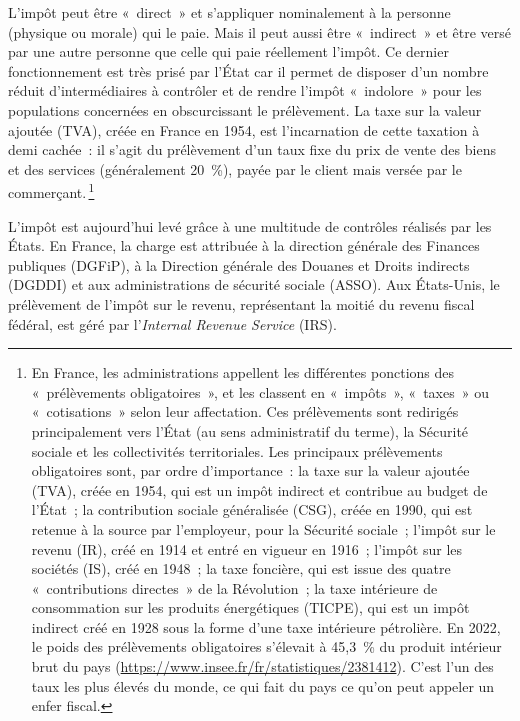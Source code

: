 \documentclass[a4paper,notitlepage]{article}
\newcommand{\eng}[1]{{\NoAutoSpaceBeforeFDP\emph{#1}}}  %
\newcommand{\sfootnote}{\,\footnote}
\begin{document}
L'impôt peut être «~direct~» et s'appliquer nominalement à la personne (physique ou morale) qui le paie. Mais il peut aussi être «~indirect~» et être versé par une autre personne que celle qui paie réellement l'impôt. Ce dernier fonctionnement est très prisé par l'État car il permet de disposer d'un nombre réduit d'intermédiaires à contrôler et de rendre l'impôt «~indolore~» pour les populations concernées en obscurcissant le prélèvement. La taxe sur la valeur ajoutée (TVA), créée en France en 1954, est l'incarnation de cette taxation à demi cachée~: il s'agit du prélèvement d'un taux fixe du prix de vente des biens et des services (généralement 20~\%), payée par le client mais versée par le commerçant.\sfootnote{En France, les administrations appellent les différentes ponctions des «~prélèvements obligatoires~», et les classent en «~impôts~», «~taxes~» ou «~cotisations~» selon leur affectation. Ces prélèvements sont redirigés principalement vers l'État (au sens administratif du terme), la Sécurité sociale et les collectivités territoriales. Les principaux prélèvements obligatoires sont, par ordre d'importance~: la taxe sur la valeur ajoutée (TVA), créée en 1954, qui est un impôt indirect et contribue au budget de l'État~; la contribution sociale généralisée (CSG), créée en 1990, qui est retenue à la source par l'employeur, pour la Sécurité sociale~; l'impôt sur le revenu (IR), créé en 1914 et entré en vigueur en 1916~; l'impôt sur les sociétés (IS), créé en 1948~; la taxe foncière, qui est issue des quatre «~contributions directes~» de la Révolution~; la taxe intérieure de consommation sur les produits énergétiques (TICPE), qui est un impôt indirect créé en 1928 sous la forme d'une taxe intérieure pétrolière. En 2022, le poids des prélèvements obligatoires s'élevait à 45,3~\% du produit intérieur brut du pays (\url{https://www.insee.fr/fr/statistiques/2381412}). C'est l'un des taux les plus élevés du monde, ce qui fait du pays ce qu'on peut appeler un enfer fiscal.}


L'impôt est aujourd'hui levé grâce à une multitude de contrôles réalisés par les États. En France, la charge est attribuée à la direction générale des Finances publiques (DGFiP), à la Direction générale des Douanes et Droits indirects (DGDDI) et aux administrations de sécurité sociale (ASSO). Aux États-Unis, le prélèvement de l'impôt sur le revenu, représentant la moitié du revenu fiscal fédéral, est géré par l'\eng{Internal Revenue Service} (IRS).
\end{document}
